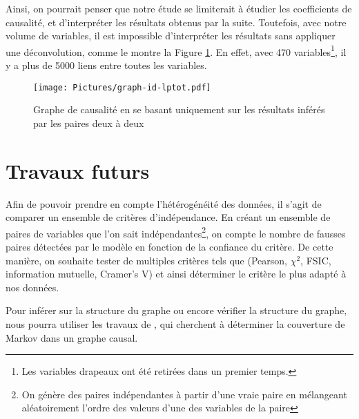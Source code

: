 \documentclass[11pt,fleqn,openany,frenchb]{book} %
\begin{document}
Ainsi, on pourrait penser que notre étude se limiterait à étudier les coefficients de causalité, et d'interpréter les résultats obtenus par la suite. Toutefois, avec notre volume de variables, il est impossible d'interpréter les résultats sans appliquer une déconvolution, comme le montre la Figure \ref{fig:graph-ind-lp}. En effet, avec 470 variables\footnote{Les variables drapeaux ont été retirées dans un premier temps.}, il y a plus de 5000 liens entre toutes les variables.

\begin{figure}[!h]
\centering
 \texttt{[image: Pictures/graph-id-lptot.pdf]}
\caption{Graphe de causalité en se basant uniquement sur les résultats inférés par les paires deux à deux}
\label{fig:graph-ind-lp}

\end{figure}

\section{Travaux futurs}
	Afin de pouvoir prendre en compte l’hétérogénéité des données, il s'agit de comparer un ensemble de critères d'indépendance. En créant un ensemble de paires de variables que l'on sait indépendantes\footnote{On génère des paires indépendantes à partir d'une vraie paire en mélangeant aléatoirement l'ordre des valeurs d'une des variables de la paire}, on compte le nombre de fausses paires détectées par le modèle en fonction de la confiance du critère. De cette manière, on souhaite tester de multiples critères tels que (Pearson, $\chi^2$, FSIC, information mutuelle, Cramer's V) et ainsi déterminer le critère le plus adapté à nos données.\par
Pour inférer sur la structure du graphe ou encore vérifier la structure du graphe, nous pourra utiliser les travaux de \cite{aliferis2010local}, qui cherchent à déterminer la couverture de Markov dans un graphe causal.



%
%
\end{document}
